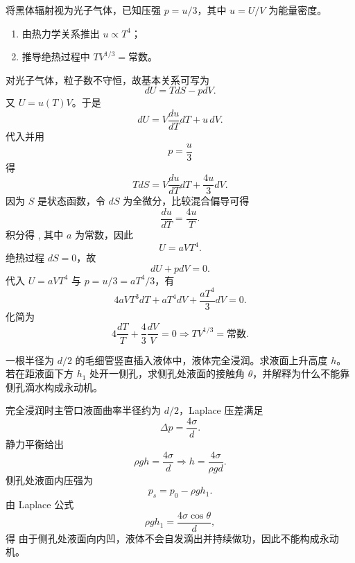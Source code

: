 \begin{question}
将黑体辐射视为光子气体，已知压强 $p=u/3$，其中 $u=U/V$ 为能量密度。
\begin{enumerate}[label=（\arabic*）,leftmargin=2.8em,itemsep=0.2em]
\item 由热力学关系推出 $u\propto T^4$；
\item 推导绝热过程中 $TV^{1/3}=\text{常数}$。
\end{enumerate}
\begin{solution}

对光子气体，粒子数不守恒，故基本关系可写为
\[
 dU=T dS-p dV.
\]
又 $U=u(T)V$。于是
\[
 dU=V\frac{du}{dT}dT+u\,dV.
\]
代入并用
\[
 p=\frac{u}{3}
\]
得
\[
T dS=V\frac{du}{dT}dT+\frac{4u}{3}dV.
\]
因为 $S$ 是状态函数，令 $dS$ 为全微分，比较混合偏导可得
\[
\frac{d u}{dT}=\frac{4u}{T}.
\]
积分得
,
其中 $a$ 为常数，因此
\[
U=aVT^4.
\]
绝热过程 $dS=0$，故
\[
 dU+p dV=0.
\]
代入 $U=aVT^4$ 与 $p=u/3=aT^4/3$，有
\[
4aVT^3dT+aT^4dV+\frac{aT^4}{3}dV=0.
\]
化简为
\[
4\frac{dT}{T}+\frac{4}{3}\frac{dV}{V}=0
\Longrightarrow
\boxed{TV^{1/3}=\text{常数}.}
\]
\end{solution}
\end{question}

\begin{question}
一根半径为 $d/2$ 的毛细管竖直插入液体中，液体完全浸润。求液面上升高度 $h$。若在距液面下方 $h_1$ 处开一侧孔，求侧孔处液面的接触角 $\theta$，并解释为什么不能靠侧孔滴水构成永动机。
\begin{solution}

完全浸润时主管口液面曲率半径约为 $d/2$，Laplace 压差满足
\[
\Delta p=\frac{4\sigma}{d}.
\]
静力平衡给出
\[
\rho gh=\frac{4\sigma}{d}
\Longrightarrow
\boxed{h=\frac{4\sigma}{\rho gd}.}
\]
侧孔处液面内压强为
\[
p_s=p_0-\rho gh_1.
\]
由 Laplace 公式
\[
\rho gh_1=\frac{4\sigma\cos\theta}{d},
\]
得
由于侧孔处液面向内凹，液体不会自发滴出并持续做功，因此不能构成永动机。
\end{solution}
\end{question}


